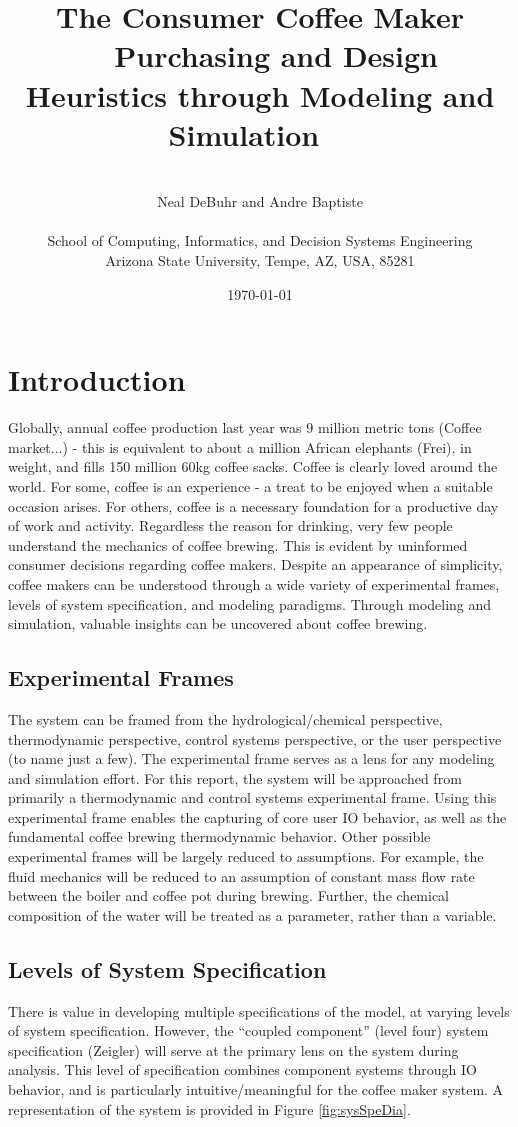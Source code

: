 \documentclass[10pt]{article}
\title{%
  The Consumer Coffee Maker \\
  {\large \subtitleaccent~~Purchasing and Design Heuristics through Modeling and Simulation~~\subtitleaccent}}
\author{%
  ~\\
  Neal DeBuhr and Andre Baptiste\\
  ~\\
  School of Computing, Informatics, and Decision Systems Engineering\\
  Arizona State University, Tempe, AZ, USA, 85281
}
\date{\today}
\begin{document}
\maketitle

\newpage
\tableofcontents
\newpage

\section{Introduction}
\label{sec:int}
Globally, annual coffee production last year was 9 million metric tons (Coffee market...) - this is equivalent to about a million African elephants (Frei), in weight, and fills 150 million 60kg coffee sacks.  Coffee is clearly loved around the world.  For some, coffee is an experience - a treat to be enjoyed when a suitable occasion arises.  For others, coffee is a necessary foundation for a productive day of work and activity.  Regardless the reason for drinking, very few people understand the mechanics of coffee brewing.  This is evident by uninformed consumer decisions regarding coffee makers.  Despite an appearance of simplicity, coffee makers can be understood through a wide variety of experimental frames, levels of system specification, and modeling paradigms.  Through modeling and simulation, valuable insights can be uncovered about coffee brewing.

\subsection{Experimental Frames}
The system can be framed from the hydrological/chemical perspective, thermodynamic perspective, control systems perspective, or the user perspective (to name just a few).  The experimental frame serves as a lens for any modeling and simulation effort.  For this report, the system will be approached from primarily a thermodynamic and control systems experimental frame.  Using this experimental frame enables the capturing of core user IO behavior, as well as the fundamental coffee brewing thermodynamic behavior.  Other possible experimental frames will be largely reduced to assumptions.  For example, the fluid mechanics will be reduced to an assumption of constant mass flow rate between the boiler and coffee pot during brewing.  Further, the chemical composition of the water will be treated as a parameter, rather than a variable.  

\subsection{Levels of System Specification}
There is value in developing multiple specifications of the model, at varying levels of system specification.  However, the ``coupled component'' (level four) system specification (Zeigler) will serve at the primary lens on the system during analysis.  This level of specification combines component systems through IO behavior, and is particularly intuitive/meaningful for the coffee maker system.  A representation of the system is provided in Figure \ref{fig:sysSpeDia}.  %
\end{document}
